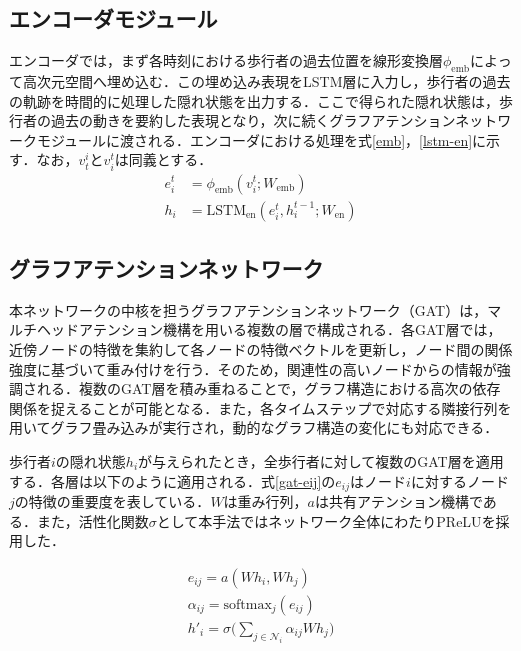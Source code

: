 
\subsection{エンコーダモジュール}
エンコーダでは，まず各時刻における歩行者の過去位置を線形変換層$\phi_{\text{emb}}$によって高次元空間へ埋め込む．この埋め込み表現をLSTM層に入力し，歩行者の過去の軌跡を時間的に処理した隠れ状態を出力する．ここで得られた隠れ状態は，歩行者の過去の動きを要約した表現となり，次に続くグラフアテンションネットワークモジュールに渡される．エンコーダにおける処理を式\eqref{emb}，\eqref{lstm-en}に示す．なお，$v^i_t \text{と} v^t_i$は同義とする．
\begin{align}
  e^t_i &= \phi_{\text{emb}}(v^t_i ; W_{\text{emb}}) \label{emb} \\
  h_i &= \text{LSTM}_{\text{en}}(e^t_i, h^{t-1}_i ; W_{\text{en}}) \label{lstm-en}
\end{align}

\subsection{グラフアテンションネットワーク}
本ネットワークの中核を担うグラフアテンションネットワーク（GAT）\cite{velickovic2017graph-gat}は，マルチヘッドアテンション機構を用いる複数の層で構成される．各GAT層では，近傍ノードの特徴を集約して各ノードの特徴ベクトルを更新し，ノード間の関係強度に基づいて重み付けを行う．そのため，関連性の高いノードからの情報が強調される．複数のGAT層を積み重ねることで，グラフ構造における高次の依存関係を捉えることが可能となる．また，各タイムステップで対応する隣接行列を用いてグラフ畳み込みが実行され，動的なグラフ構造の変化にも対応できる．

歩行者$i$の隠れ状態$h_i$が与えられたとき，全歩行者に対して複数のGAT層を適用する．各層は以下のように適用される．式\eqref{gat-eij}の$e_{ij}$はノード$i$に対するノード$j$の特徴の重要度を表している．$W$は重み行列，$a$は共有アテンション機構である．また，活性化関数$\sigma$として本手法ではネットワーク全体にわたりPReLU\cite{he2015delving-prelu}を採用した．

\begin{align}
  e_{ij} = a(Wh_i, Wh_j) \label{gat-eij} \\
  \alpha_{ij} = \text{softmax}_{j}(e_{ij}) \\
  h'_i = \sigma\Bigg(\sum_{j \in \mathcal{N}_i} \alpha_{ij}Wh_j \Bigg)
\end{align}

